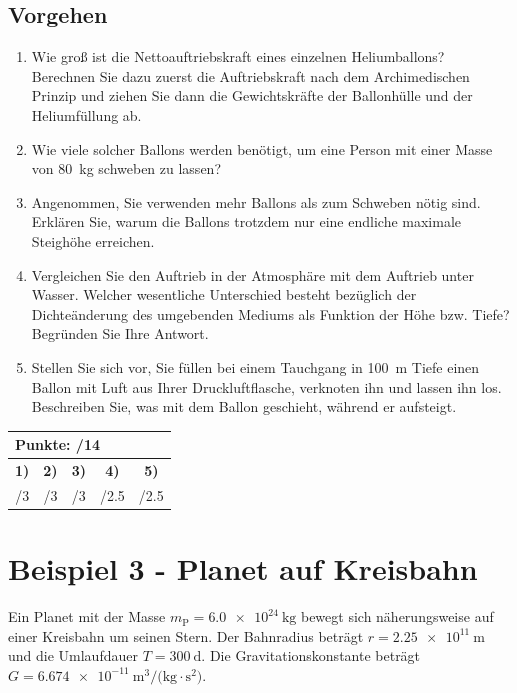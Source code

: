 \documentclass[11pt, a4paper]{article}
\begin{document}
\subsection*{Vorgehen}
\begin{enumerate}
    \item Wie groß ist die Nettoauftriebskraft eines einzelnen Heliumballons? Berechnen Sie dazu zuerst die Auftriebskraft nach dem Archimedischen Prinzip und ziehen Sie dann die Gewichtskräfte der Ballonhülle und der Heliumfüllung ab.
    \item Wie viele solcher Ballons werden benötigt, um eine Person mit einer Masse von \SI{80}{\kilogram} schweben zu lassen?
    \item Angenommen, Sie verwenden mehr Ballons als zum Schweben nötig sind. Erklären Sie, warum die Ballons trotzdem nur eine endliche maximale Steighöhe erreichen.
    \item Vergleichen Sie den Auftrieb in der Atmosphäre mit dem Auftrieb unter Wasser. Welcher wesentliche Unterschied besteht bezüglich der Dichteänderung des umgebenden Mediums als Funktion der Höhe bzw. Tiefe? Begründen Sie Ihre Antwort.
    \item Stellen Sie sich vor, Sie füllen bei einem Tauchgang in \SI{100}{\metre} Tiefe einen Ballon mit Luft aus Ihrer Druckluftflasche, verknoten ihn und lassen ihn los. Beschreiben Sie, was mit dem Ballon geschieht, während er aufsteigt.
\end{enumerate}

\vfill
\begin{flushright}
\renewcommand{\arraystretch}{1.23}
\begin{tabular}{|c | c | c | c | c|}
\hline
\multicolumn{5}{|l|}{\textbf{\large{Punkte: \quad\quad\quad /14}}}\\
\hline
\textbf{1)} & \textbf{2)} & \textbf{3)} & \textbf{4)} & \textbf{5)} \\
\quad/3 & \quad/3 & \quad/3 & \quad/2.5 & \quad/2.5 \\
\hline
\end{tabular}
\end{flushright}

\newpage

\section*{Beispiel 3 - Planet auf Kreisbahn}

Ein Planet mit der Masse $m_{\text{P}} = \SI{6.0e24}{\kilogram}$ bewegt sich näherungsweise auf einer Kreisbahn um seinen Stern. Der Bahnradius beträgt $r = \SI{2.25e11}{\metre}$ und die Umlaufdauer $T = \SI{300}{\day}$. Die Gravitationskonstante beträgt $G = \SI{6.674e-11}{\metre\cubed\per(\kilogram\cdot\second\squared)}$.
\end{document}
